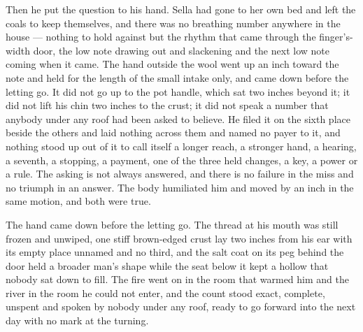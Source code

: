 Then he put the question to his hand. Sella had gone to her own bed and left the coals to keep themselves, and there was no breathing number anywhere in the house --- nothing to hold against but the rhythm that came through the finger's-width door, the low note drawing out and slackening and the next low note coming when it came. The hand outside the wool went up an inch toward the note and held for the length of the small intake only, and came down before the letting go. It did not go up to the pot handle, which sat two inches beyond it; it did not lift his chin two inches to the crust; it did not speak a number that anybody under any roof had been asked to believe. He filed it on the sixth place beside the others and laid nothing across them and named no payer to it, and nothing stood up out of it to call itself a longer reach, a stronger hand, a hearing, a seventh, a stopping, a payment, one of the three held changes, a key, a power or a rule. The asking is not always answered, and there is no failure in the miss and no triumph in an answer. The body humiliated him and moved by an inch in the same motion, and both were true.

The hand came down before the letting go. The thread at his mouth was still frozen and unwiped, one stiff brown-edged crust lay two inches from his ear with its empty place unnamed and no third, and the salt coat on its peg behind the door held a broader man's shape while the seat below it kept a hollow that nobody sat down to fill. The fire went on in the room that warmed him and the river in the room he could not enter, and the count stood exact, complete, unspent and spoken by nobody under any roof, ready to go forward into the next day with no mark at the turning.
